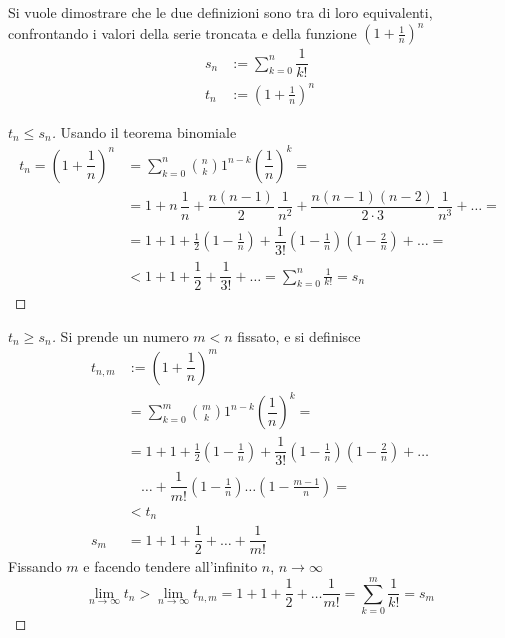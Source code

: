 Si vuole dimostrare che le due definizioni sono tra di loro equivalenti, confrontando i valori della serie troncata e della funzione $\left(1 + \frac{1}{n}\right)^n$
\begin{equation}
\begin{aligned}
    s_n & := \sum_{k=0}^{n} \dfrac{1}{k!} \\
    t_n & := \left( 1+ \frac{1}{n}  \right)^n
\end{aligned}
\end{equation}
\begin{proof}[$t_n \le s_n$] Usando il teorema binomiale
\begin{equation}
\begin{aligned}
    t_n = \left( 1 + \dfrac{1}{n} \right)^n 
    & = \sum_{k=0}^{n} \binom{n}{k} 1^{n-k} \left(\dfrac{1}{n} \right)^{k} = \\
    & = 1 + n \, \dfrac{1}{n} + \dfrac{n(n-1)}{2} \, \dfrac{1}{n^2} +  \dfrac{n(n-1)(n-2)}{2 \cdot 3} \, \dfrac{1}{n^3} + \dots = \\
    & = 1 + 1 + \frac{1}{2} \left( 1 - \frac{1}{n} \right) +  \dfrac{1}{3!} \left( 1-\frac{1}{n} \right) \left( 1-\frac{2}{n} \right) + \dots = \\
    & < 1 + 1 + \dfrac{1}{2} + \dfrac{1}{3!} + \dots = \sum_{k=0}^{n} \frac{1}{k!} = s_n
\end{aligned}
\end{equation}
\end{proof}
\begin{proof}[$t_n \ge s_n$]
Si prende un numero $m < n$ fissato, e si definisce
{\small
\begin{equation}
\begin{aligned}
    t_{n,m} & := \left( 1 + \dfrac{1}{n} \right)^m \\
    & = \sum_{k=0}^{m} \binom{m}{k} 1^{n-k} \left(\dfrac{1}{n} \right)^{k} = \\
    & = 1 + 1 + \frac{1}{2} \left( 1 - \frac{1}{n} \right) +  \dfrac{1}{3!} \left( 1-\frac{1}{n} \right) \left( 1-\frac{2}{n} \right) + \dots \\
    & \quad \dots + \dfrac{1}{m!}\left(1-\frac{1}{n}\right) \dots \left(1-\frac{m-1}{n}\right) = \\
    & < t_n \\
    s_m & = 1 + 1 + \dfrac{1}{2} + \dots + \dfrac{1}{m!}
\end{aligned}
\end{equation}
}
Fissando $m$ e facendo tendere all'infinito $n$, $n \rightarrow \infty$
\begin{equation}
    \lim_{n \rightarrow \infty} t_n > \lim_{n \rightarrow \infty} t_{n,m} = 1 + 1 + \dfrac{1}{2} + \dots \dfrac{1}{m!} = \sum_{k=0}^{m} \dfrac{1}{k!} = s_m
\end{equation}
\end{proof}

